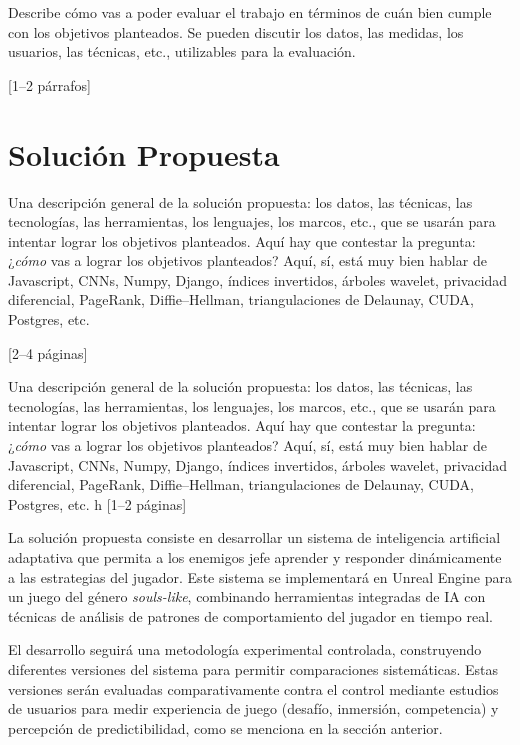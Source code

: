\documentclass[informe]{upropuesta}
\begin{document}
  

  
\begin{pauta}
Describe cómo vas a poder evaluar el trabajo en términos de cuán bien cumple con los objetivos planteados. Se pueden discutir los datos, las medidas, los usuarios, las técnicas, etc., utilizables para la evaluación.
  
[1--2 párrafos]
\end{pauta}

\section{Solución Propuesta}\label{sec:sol}

\begin{pauta}
Una descripción general de la solución propuesta: los datos, las técnicas, las tecnologías, las herramientas, los lenguajes, los marcos, etc., que se usarán para intentar lograr los objetivos planteados. Aquí hay que contestar la pregunta: ¿\textit{cómo} vas a lograr los objetivos planteados? Aquí, sí, está muy bien hablar de Javascript, CNNs, Numpy, Django, índices invertidos, árboles wavelet, privacidad diferencial, PageRank, Diffie--Hellman, triangulaciones de Delaunay, CUDA, Postgres, etc.

[2--4 páginas]
\end{pauta}

\begin{pauta}
Una descripción general de la solución propuesta: los datos, las técnicas, las tecnologías, las herramientas, los lenguajes, los marcos, etc., que se usarán para intentar lograr los objetivos planteados. Aquí hay que contestar la pregunta: ¿\textit{cómo} vas a lograr los objetivos planteados? Aquí, sí, está muy bien hablar de Javascript, CNNs, Numpy, Django, índices invertidos, árboles wavelet, privacidad diferencial, PageRank, Diffie--Hellman, triangulaciones de Delaunay, CUDA, Postgres, etc.
h
[1--2 páginas]
\end{pauta}

La solución propuesta consiste en desarrollar un sistema de inteligencia artificial adaptativa que permita a los enemigos jefe aprender y responder dinámicamente a las estrategias del jugador. Este sistema se implementará en Unreal Engine para un juego del género \textit{souls-like}, combinando herramientas integradas de IA con técnicas de análisis de patrones de comportamiento del jugador en tiempo real.

El desarrollo seguirá una metodología experimental controlada, construyendo diferentes versiones del sistema para permitir comparaciones sistemáticas. Estas versiones serán evaluadas comparativamente contra el control mediante estudios de usuarios para medir experiencia de juego (desafío, inmersión, competencia) y percepción de predictibilidad, como se menciona en la sección anterior.
\end{document}

